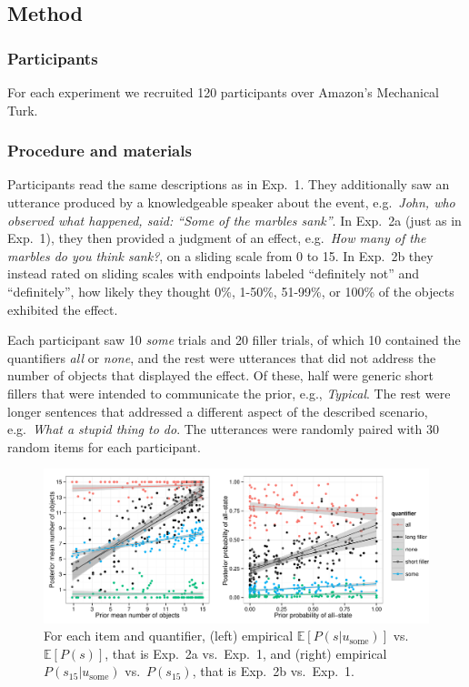 \documentclass[10pt,letterpaper]{article}
\begin{document}
\subsection{Method}

\subsubsection{Participants}
For each experiment we recruited 120 participants over Amazon's Mechanical Turk.

\subsubsection{Procedure and materials}

Participants read the same descriptions as in Exp.~1. They additionally saw an utterance produced by a knowledgeable speaker about the event, e.g.~\textit{John, who observed what happened, said: ``Some of the marbles sank''}. In Exp.~2a (just as in Exp.~1), they then provided a judgment of an effect, e.g.~\textit{How many of the marbles do you think sank?}, on a sliding scale from 0 to 15. In Exp.~2b they instead rated on sliding scales with endpoints labeled ``definitely not'' and ``definitely'', how likely they thought 0\%, 1-50\%, 51-99\%, or 100\% of the objects exhibited the effect.

Each participant saw 10 \emph{some} trials and 20 filler trials, of which 10 contained the quantifiers \emph{all} or \emph{none}, and the rest were utterances that did not address the number of objects that displayed the effect. Of these, half were generic short fillers that were intended to communicate the prior, e.g., \emph{Typical}. The rest were longer sentences that addressed a different aspect of the described scenario, e.g.~\emph{What a stupid thing to do}. The utterances were randomly paired with 30 random items for each participant.

 
\begin{figure}
	\includegraphics[width=\textwidth]{pics/empirical-results}	
	\caption{For each item and quantifier, (left) empirical $\mathbb{E}[P(s|u_{\textrm{some}})]$ vs. $\mathbb{E}[P(s)]$, that is Exp.~2a vs.~Exp.~1,  and (right) empirical $P(s_{15}|u_{\textrm{some}})$ vs.~$P(s_{15})$, that is Exp.~2b vs.~Exp.~1.}
	\label{fig:empiricalresults}	
\end{figure}
\end{document}
